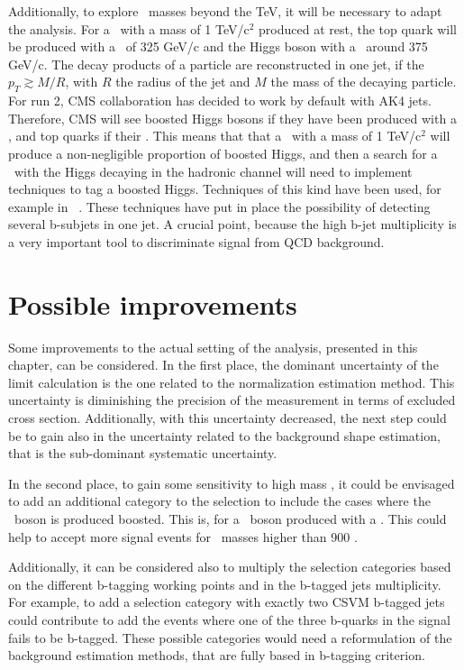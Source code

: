 Additionally, to explore \Tp~masses beyond the TeV, it will be necessary to adapt the analysis. For a \Tp~with a mass of 1 TeV/$\text{c}^{2}$ produced at rest, the top quark will be produced with a \pt~of 325 GeV/c and the Higgs boson with a \pt~around 375 GeV/c. The decay products of a particle are reconstructed in one jet, if the $p_{T}\gtrsim M/R$, with $R$ the radius of the jet and $M$ the mass of the decaying particle. For run 2, CMS collaboration has decided to work by default with AK4 jets. Therefore, CMS will see boosted Higgs bosons if they have been produced with a , and top quarks if their . This means that that a \Tp~with a mass of 1 TeV/$\text{c}^{2}$ will produce a non-negligible proportion of boosted Higgs, and then a search for a \Tp~with the Higgs decaying in the hadronic channel will need to implement techniques to tag a boosted Higgs. Techniques of this kind have been used, for example in~ \cite{Khachatryan:2015axa}. These techniques have put in place the possibility of detecting several b-subjets in one jet. A crucial point, because the high b-jet multiplicity is a very important tool to discriminate signal from QCD background.

\section{Possible improvements}
\label{sec:impro}

Some improvements to the actual setting of the analysis, presented in this chapter, can be considered. In the first place, the dominant uncertainty of the limit calculation is the one related to the normalization estimation method. This uncertainty is diminishing the precision of the measurement in terms of excluded cross section. Additionally, with this uncertainty decreased, the next step could be to gain also in the uncertainty related to the background shape estimation, that is the sub-dominant systematic uncertainty.

In the second place, to gain some sensitivity to high mass \Tp, it could be envisaged to add an additional category to the selection to include the cases where the \W~boson is produced boosted. This is, for a \W~boson produced with a . This could help to accept more signal events for \Tp~masses higher than 900 \GeVcc.

Additionally, it can be considered also to multiply the selection categories based on the different b-tagging working points and in the b-tagged jets multiplicity. For example, to add a selection category with exactly two CSVM b-tagged jets could contribute to add the events where one of the three b-quarks in the signal fails to be b-tagged. These possible categories would need a reformulation of the background estimation methods, that are fully based in b-tagging criterion.

